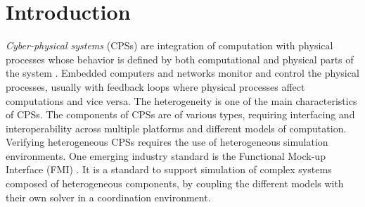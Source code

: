 \section{Introduction}

\textit{Cyber-physical systems} (CPSs) are integration of computation with physical processes whose behavior is defined by both computational and physical parts of the system \cite{Zanero17}. Embedded computers and networks monitor and control the physical processes, usually with feedback loops where physical processes affect computations and vice versa. The heterogeneity is one of the main characteristics of CPSs. The components of CPSs are of various types, requiring interfacing and interoperability across multiple platforms and different models of computation. Verifying heterogeneous CPSs requires the use of heterogeneous simulation environments. One emerging industry standard is the Functional Mock-up Interface (FMI) \cite{Blochwitz2011The}\cite{BromanBGLMTW13}. It is a standard to support simulation of complex systems composed of heterogeneous components, by coupling the different models with their own solver in a coordination environment.

